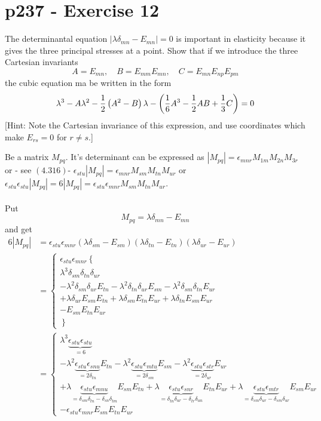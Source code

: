 \section{p237 - Exercise 12}
\begin{tcolorbox}
The determinantal equation $\left|\lambda\delta_{mn}-E_{mn}\right|=0$ is important in elasticity because it gives the three principal stresses at a point. Show that if we introduce the three Cartesian invariants
$$A=E_{mn},\quad B=E_{mm}E_{mn}, \quad C= E_{mn}E_{np}E_{pm}$$ the cubic equation ma be written in the form
$$\lambda^3-A\lambda^2-\frac{1}{2}\left(A^2-B\right)\lambda-\left(\frac{1}{6}A^3-\frac{1}{2} AB+\frac{1}{3}C\right)=0$$
[Hint: Note the Cartesian invariance of this expression, and use coordinates which make $E_{rs}=0$ for $r\neq s$.]
\end{tcolorbox}
Be a matrix $M_{pq}$. It's determinant can be expressed as $\left|M_{pq}\right|= \epsilon_{mnr}M_{1m}M_{2n}M_{3r}$ or - see $\mathbf{(4.316)}$-  $\epsilon_{stu}\left|M_{pq}\right|= \epsilon_{mnr}M_{sm}M_{tn}M_{ur}$ or $\epsilon_{stu}\epsilon_{stu}\left|M_{pq}\right|=6\left|M_{pq}\right|= \epsilon_{stu}\epsilon_{mnr}M_{sm}M_{tn}M_{ur}$.\\\\
Put $$M_{pq}= \lambda\delta_{mn}-E_{mn}$$
and get
\begin{align}
6\left|M_{pq}\right|&= \epsilon_{stu}\epsilon_{mnr}\left(\lambda\delta_{sm}-E_{sm}\right)\left(\lambda\delta_{tn}-E_{tn}\right)\left(\lambda\delta_{ur}-E_{ur}\right)\\
&=\left\{\begin{array}{l}
\epsilon_{stu}\epsilon_{mnr}\left\{\right.\\
\lambda^3\delta_{sm}\delta_{tn}\delta_{ur}\\
-\lambda^2\delta_{sm}\delta_{ur}E_{tn}-\lambda^2\delta_{tn}\delta_{ur}E_{sm}-\lambda^2\delta_{sm}\delta_{tn}E_{ur}\\
+\lambda\delta_{ur}E_{sm}E_{tn}+\lambda\delta_{sm}E_{tn}E_{ur}+\lambda\delta_{tn}E_{sm}E_{ur}\\
-E_{sm}E_{tn}E_{ur}\\
\left.\right\}
\end{array}\right.\\
&=\left\{\begin{array}{l}
\lambda^3\underbrace{\epsilon_{stu}\epsilon_{stu}}_{=6}\\
-\lambda^2\underbrace{\epsilon_{stu}\epsilon_{snu}}_{=2\delta_{tn}}E_{tn}-\lambda^2\underbrace{\epsilon_{stu}\epsilon_{mtu}}_{=2\delta_{sm}}E_{sm}-\lambda^2\underbrace{\epsilon_{stu}\epsilon_{str}}_{=2\delta_{ur}}E_{ur}\\
+\lambda\underbrace{\epsilon_{stu}\epsilon_{mnu}}_{=\delta_{sm}\delta_{tn}-\delta_{sn}\delta_{tm}}E_{sm}E_{tn}+\lambda\underbrace{\epsilon_{stu}\epsilon_{snr}}_{=\delta_{tn}\delta_{ur}-\delta_{tr}\delta_{un}}E_{tn}E_{ur}+\lambda\underbrace{\epsilon_{stu}\epsilon_{mtr}}_{=\delta_{sm}\delta_{ur}-\delta_{sm}\delta_{ur}}E_{sm}E_{ur}\\
-\epsilon_{stu}\epsilon_{mnr}E_{sm}E_{tn}E_{ur}
\end{array}\right.
\end{align}
